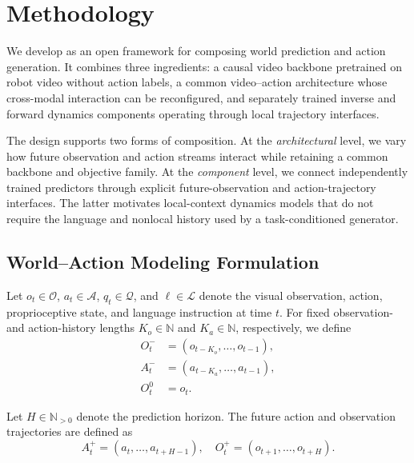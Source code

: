 \section{Methodology}
\label{sec:method}

We develop \ours as an open framework for composing world prediction and
action generation. It combines three ingredients: a causal video backbone
pretrained on robot video without action labels, a common video--action
architecture whose cross-modal interaction can be reconfigured, and
separately trained inverse and forward dynamics components operating through
local trajectory interfaces.

The design supports two forms of composition. At the \emph{architectural}
level, we vary how future observation and action streams interact while
retaining a common backbone and objective family. At the
\emph{component} level, we connect independently trained predictors through
explicit future-observation and action-trajectory interfaces. The latter
motivates local-context dynamics models that do not require the language and
nonlocal history used by a task-conditioned generator.


\subsection{World--Action Modeling Formulation}
\label{sec:world-action-interfaces}

Let \(o_t \in \mathcal{O}\), \(a_t \in \mathcal{A}\), \(q_t \in \mathcal{Q}\), and \(\ell\in\mathcal{L}\) denote the visual observation, action, proprioceptive state, and language instruction at time $t$. For fixed observation- and action-history lengths \(K_o\in\mathbb{N}\) and \(K_a\in\mathbb{N}\), respectively, we define
\begin{equation}
\begin{aligned}
O_t^- &= (o_{t-K_o}, \ldots, o_{t-1}), \\
A_t^- &= (a_{t-K_a}, \ldots, a_{t-1}), \\
O_t^0 &= o_t.
\end{aligned}
\end{equation}

Let \(H\in\mathbb N_{>0}\) denote the prediction horizon. The future action and observation trajectories are defined as
\begin{equation}
A_t^+ = (a_t, \ldots, a_{t+H-1}), \quad O_t^+ = (o_{t+1}, \ldots, o_{t+H}).
\end{equation}

